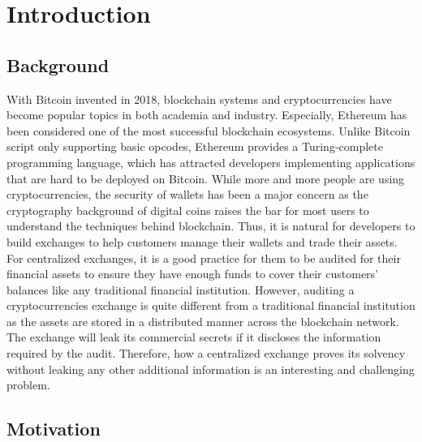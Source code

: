 \chapter{Introduction}

\section{Background}

With Bitcoin invented in 2018, blockchain systems and cryptocurrencies have become popular topics in both academia and industry. Especially, Ethereum has been considered one of the most successful blockchain ecosystems. Unlike Bitcoin script only supporting basic opcodes, Ethereum provides a Turing-complete programming language, which has attracted developers implementing applications that are hard to be deployed on Bitcoin. While more and more people are using cryptocurrencies, the security of wallets has been a major concern as the cryptography background of digital coins raises the bar for most users to understand the techniques behind blockchain. Thus, it is natural for developers to build exchanges to help customers manage their wallets and trade their assets. For centralized exchanges, it is a good practice for them to be audited for their financial assets to ensure they have enough funds to cover their customers' balances like any traditional financial institution. However, auditing a cryptocurrencies exchange is quite different from a traditional financial institution as the assets are stored in a distributed manner across the blockchain network. The exchange will leak its commercial secrets if it discloses the information required by the audit. Therefore, how a centralized exchange proves its solvency without leaking any other additional information is an interesting and challenging problem.

\section{Motivation}


